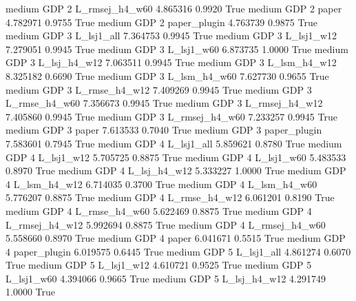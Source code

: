     medium      GDP                 2 L_rmsej_h4_w60   4.865316      0.9920    True
    medium      GDP                 2          paper   4.782971      0.9755    True
    medium      GDP                 2   paper_plugin   4.763739      0.9875    True
    medium      GDP                 3     L_lsj1_all   7.364753      0.9945    True
    medium      GDP                 3     L_lsj1_w12   7.279051      0.9945    True
    medium      GDP                 3     L_lsj1_w60   6.873735      1.0000    True
    medium      GDP                 3   L_lsj_h4_w12   7.063511      0.9945    True
    medium      GDP                 3   L_lsm_h4_w12   8.325182      0.6690    True
    medium      GDP                 3   L_lsm_h4_w60   7.627730      0.9655    True
    medium      GDP                 3  L_rmse_h4_w12   7.409269      0.9945    True
    medium      GDP                 3  L_rmse_h4_w60   7.356673      0.9945    True
    medium      GDP                 3 L_rmsej_h4_w12   7.405860      0.9945    True
    medium      GDP                 3 L_rmsej_h4_w60   7.233257      0.9945    True
    medium      GDP                 3          paper   7.613533      0.7040    True
    medium      GDP                 3   paper_plugin   7.583601      0.7945    True
    medium      GDP                 4     L_lsj1_all   5.859621      0.8780    True
    medium      GDP                 4     L_lsj1_w12   5.705725      0.8875    True
    medium      GDP                 4     L_lsj1_w60   5.483533      0.8970    True
    medium      GDP                 4   L_lsj_h4_w12   5.333227      1.0000    True
    medium      GDP                 4   L_lsm_h4_w12   6.714035      0.3700    True
    medium      GDP                 4   L_lsm_h4_w60   5.776207      0.8875    True
    medium      GDP                 4  L_rmse_h4_w12   6.061201      0.8190    True
    medium      GDP                 4  L_rmse_h4_w60   5.622469      0.8875    True
    medium      GDP                 4 L_rmsej_h4_w12   5.992694      0.8875    True
    medium      GDP                 4 L_rmsej_h4_w60   5.558660      0.8970    True
    medium      GDP                 4          paper   6.041671      0.5515    True
    medium      GDP                 4   paper_plugin   6.019575      0.6445    True
    medium      GDP                 5     L_lsj1_all   4.861274      0.6070    True
    medium      GDP                 5     L_lsj1_w12   4.610721      0.9525    True
    medium      GDP                 5     L_lsj1_w60   4.394066      0.9665    True
    medium      GDP                 5   L_lsj_h4_w12   4.291749      1.0000    True
